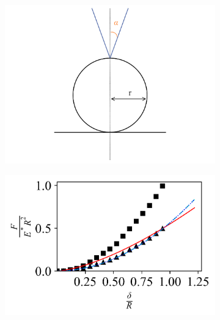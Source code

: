 \begin{figure}[H]
    \begin{subfigure}[t]{0.32\textwidth}
        \centering
        \caption{\label{fig: Cone-Sphere-Setup}}
        \includegraphics[width=1\linewidth]{Figures/Cone-Sphere-Setup.png}
    \end{subfigure}
    \hfill
    \begin{subfigure}[t]{0.32\textwidth}
        \centering
        \caption{\label{fig: Cone-Sphere-Contact_Models} }
        \includegraphics[width=1\linewidth]{Figures/Cone-Sphere-Contact_Models.png}
    \end{subfigure}
    \hfill  
    \begin{subfigure}[t]{0.32\textwidth}
        \centering
        \caption{\label{fig: Cone-Sphere-Youngs_Modulus} }

\end{subfigure}
\end{figure}
